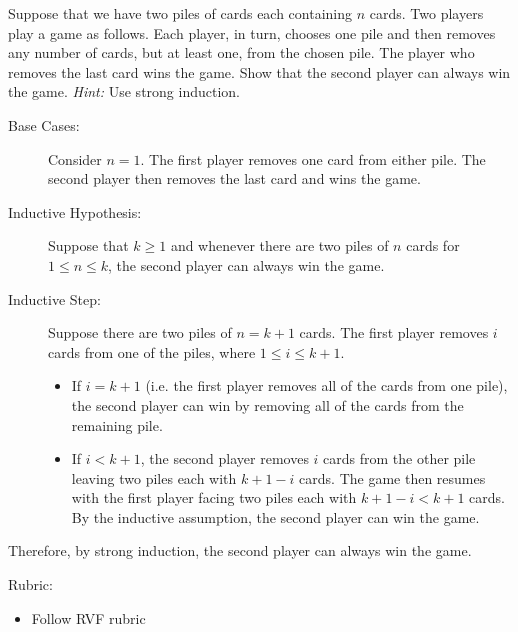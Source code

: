 \documentclass{article}
\theoremstyle{definition}
\begin{document}
\begin{question}{9}
    Suppose that we have two piles of cards each containing \(n\) cards. Two players play a game as follows. Each player, in turn, chooses one pile and then removes any number of cards, but at least one, from the chosen pile. The player who removes the last card wins the game. Show that the second player can always win the game. \textit{Hint:} Use strong induction.
\end{question}
\begin{solution}
	\begin{description}
	\item[Base Cases: ] Consider \(n=1\). The first player removes one card from either pile. The second player then removes the last card and wins the game.
	
	\item[Inductive Hypothesis: ] Suppose that \(k\geq 1\) and whenever there are two piles of \(n\) cards for \(1\leq n\leq k\), the second player can always win the game.
	
	\item[Inductive Step: ] Suppose there are two piles of \(n=k+1\) cards. The first player removes \(i\) cards from one of the piles, where \(1\leq i\leq k+1\). 
	\begin{itemize}
	\item If \(i=k+1\) (i.e. the first player removes all of the cards from one pile), the second player can win by removing all of the cards from the remaining pile. 
	\item If \(i<k+1\), the second player removes \(i\) cards from the other pile leaving two piles each with \(k+1-i\) cards. The game then resumes with the first player facing two piles each with \(k+1-i<k+1\) cards. By the inductive assumption, the second player can win the game.
	\end{itemize}
	\end{description}
	Therefore, by strong induction, the second player can always win the game.
	
{\color{red} Rubric:
\begin{itemize}
\item Follow RVF rubric
\end{itemize}}
\end{solution}
\end{document}
